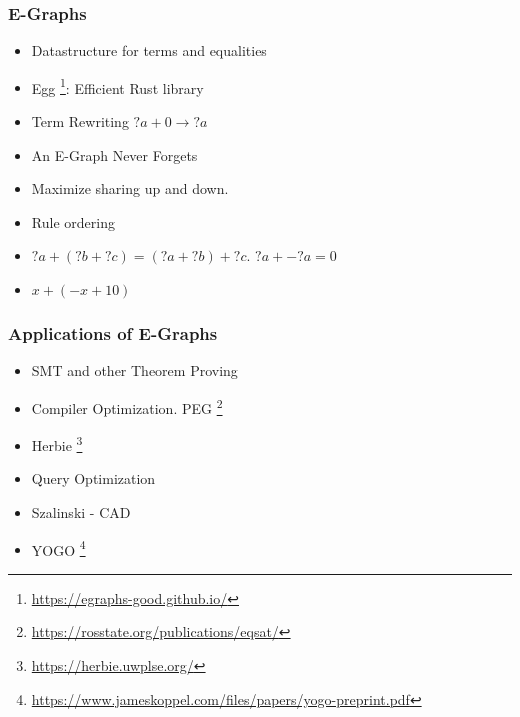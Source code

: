 \documentclass{beamer}
\begin{document}
\begin{frame}
\frametitle{E-Graphs}
\begin{itemize}
   \item Datastructure for terms and equalities
   \item Egg \footnote{\url{https://egraphs-good.github.io/}}: Efficient Rust library
   \item Term Rewriting $ ?a + 0 \rightarrow ?a$
   \item An E-Graph Never Forgets
   \item Maximize sharing up and down.
   \item Rule ordering
   \item $?a + (?b + ?c) = (?a + ?b) + ?c$. $?a + -?a = 0$
   \item $x + (-x + 10)$
\end{itemize}
\end{frame}

\begin{frame}
    \frametitle{Applications of E-Graphs}
    \begin{itemize}
       \item SMT and other Theorem Proving
        \item Compiler Optimization. PEG \footnote{\url{https://rosstate.org/publications/eqsat/}}
        \item Herbie \footnote{\url{https://herbie.uwplse.org/}}
        \item Query Optimization
        \item Szalinski - CAD
       \item YOGO \footnote{\url{https://www.jameskoppel.com/files/papers/yogo-preprint.pdf}}
    \end{itemize}
\end{frame}
\end{document}
